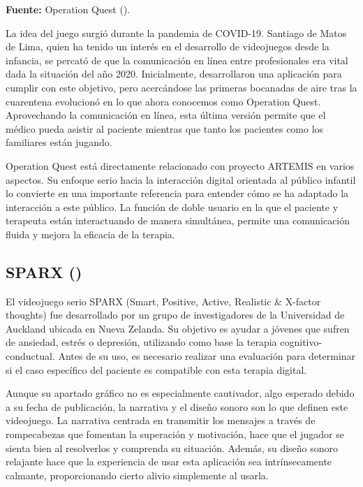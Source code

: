 \begin{center}
	\textbf{Fuente:} Operation Quest (\citeyear{OPERATIONQUEST:2024}).
\end{center}

La idea del juego surgió durante la pandemia de COVID-19. Santiago de Matos de Lima, quien ha tenido un interés en el desarrollo de videojuegos desde la infancia, se percató de que la comunicación en línea entre profesionales era vital dada la situación del año 2020. Inicialmente, desarrollaron una aplicación para cumplir con este objetivo, pero acercándose las primeras bocanadas de aire tras la cuarentena evolucionó en lo que ahora conocemos como Operation Quest. Aprovechando la comunicación en línea, esta última versión permite que el médico pueda asistir al paciente mientras que tanto los pacientes como los familiares están jugando.

Operation Quest está directamente relacionado con proyecto ARTEMIS en varios aspectos. Su enfoque serio hacia la interacción digital orientada al público infantil lo convierte en una importante referencia para entender cómo se ha adaptado la interacción a este público. La función de doble usuario en la que el paciente y terapeuta están interactuando de manera simultánea, permite una comunicación fluida y mejora la eficacia de la terapia.

\subsection{SPARX (\cite{SPARX:2013})}

El videojuego serio SPARX (Smart, Positive, Active, Realistic \& X-factor thoughts) fue desarrollado por un grupo de investigadores de la Universidad de Auckland ubicada en Nueva Zelanda. Su objetivo es ayudar a jóvenes que sufren de ansiedad, estrés o depresión, utilizando como base la terapia cognitivo-conductual. Antes de su uso, es necesario realizar una evaluación para determinar si el caso específico del paciente es compatible con esta terapia digital.

Aunque su apartado gráfico no es especialmente cautivador, algo esperado debido a su fecha de publicación, la narrativa y el diseño sonoro son lo que definen este videojuego. La narrativa centrada en transmitir los mensajes a través de rompecabezas que fomentan la superación y motivación, hace que el jugador se sienta bien al resolverlos y comprenda su situación. Además, su diseño sonoro relajante hace que la experiencia de usar esta aplicación sea intrínsecamente calmante, proporcionando cierto alivio simplemente al usarla.

